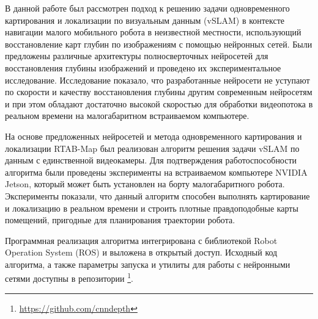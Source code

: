\documentclass{mipt-thesis-bs}
\begin{document}
В данной работе был рассмотрен подход к решению задачи одновременного картирования и локализации по визуальным данным (vSLAM) в контексте навигации малого мобильного робота в неизвестной местности, использующий восстановление карт глубин по изображениям с помощью нейронных сетей. Были предложены различные архитектуры полносверточных нейросетей для восстановления глубины изображений и проведено их экспериментальное исследование. Исследование показало, что разработанные нейросети не уступают по скорости и качеству восстановления глубины другим современным нейросетям и при этом обладают достаточно высокой скоростью для обработки видеопотока в реальном времени на малогабаритном встраиваемом компьютере.

На основе предложенных нейросетей и метода одновременного картирования и локализации RTAB-Map был реализован алгоритм решения задачи vSLAM по данным с единственной видеокамеры. Для подтверждения работоспособности алгоритма были проведены эксперименты на встраиваемом компьютере NVIDIA Jetson, который может быть установлен на борту малогабаритного робота. Эксперименты показали, что данный алгоритм способен выполнять картирование и локализацию в реальном времени и строить плотные правдоподобные карты помещений, пригодные для планирования траектории робота.

Программная реализация алгоритма интегрирована с библиотекой Robot Operation System (ROS) и выложена в открытый доступ. Исходный код алгоритма, а также параметры запуска и утилиты для работы с нейронными сетями доступны в репозитории \footnote{\href{https://github.com/cnndepth}{https://github.com/cnndepth}}.

\backmatter
\printbib
\end{document}
